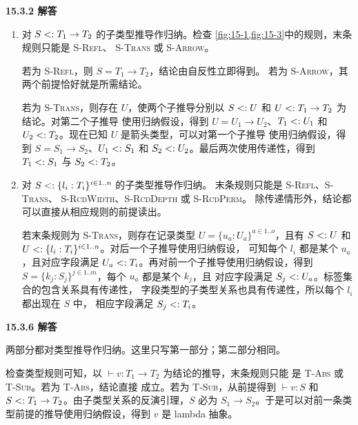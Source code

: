 \begin{taplauthorsolutionentrybox}
\label{sol:author:15.3.2}
\textbf{15.3.2 解答}

\begin{enumerate}
\item 对 \(S\mathrel{<:} T_1\to T_2\) 的子类型推导作归纳。检查
  \cref{fig:15-1,fig:15-3}中的规则，末条规则只能是 \textsc{S-Refl}、
  \textsc{S-Trans} 或 \textsc{S-Arrow}。

  若为 \textsc{S-Refl}，则 \(S=T_1\to T_2\)，结论由自反性立即得到。
  若为 \textsc{S-Arrow}，其两个前提恰好就是所需结论。

  若为 \textsc{S-Trans}，则存在 \(U\)，使两个子推导分别以
  \(S\mathrel{<:} U\) 和 \(U\mathrel{<:} T_1\to T_2\) 为结论。对第二个子推导
  使用归纳假设，得到 \(U=U_1\to U_2\)、\(T_1\mathrel{<:} U_1\) 和
  \(U_2\mathrel{<:} T_2\)。现在已知 \(U\) 是箭头类型，可以对第一个子推导
  使用归纳假设，得到 \(S=S_1\to S_2\)、\(U_1\mathrel{<:} S_1\) 和
  \(S_2\mathrel{<:} U_2\)。最后两次使用传递性，得到
  \(T_1\mathrel{<:} S_1\) 与 \(S_2\mathrel{<:} T_2\)。

\item 对 \(S\mathrel{<:}\{l_i:T_i\}^{i\in1..n}\) 的子类型推导作归纳。
  末条规则只能是 \textsc{S-Refl}、\textsc{S-Trans}、
  \textsc{S-RcdWidth}、\textsc{S-RcdDepth} 或 \textsc{S-RcdPerm}。
  除传递情形外，结论都可以直接从相应规则的前提读出。

  若末条规则为 \textsc{S-Trans}，则存在记录类型
  \(U=\{u_a:U_a\}^{a\in1..o}\)，且有 \(S\mathrel{<:} U\) 和
  \(U\mathrel{<:}\{l_i:T_i\}^{i\in1..n}\)。对后一个子推导使用归纳假设，
  可知每个 \(l_i\) 都是某个 \(u_a\)，且对应字段满足
  \(U_a\mathrel{<:} T_i\)。再对前一个子推导使用归纳假设，得到
  \(S=\{k_j:S_j\}^{j\in1..m}\)，每个 \(u_a\) 都是某个 \(k_j\)，且
  对应字段满足 \(S_j\mathrel{<:} U_a\)。标签集合的包含关系具有传递性，
  字段类型的子类型关系也具有传递性，所以每个 \(l_i\) 都出现在 \(S\) 中，
  相应字段满足 \(S_j\mathrel{<:} T_i\)。
\end{enumerate}

\end{taplauthorsolutionentrybox}

\begin{taplauthorsolutionentrybox}
\label{sol:author:15.3.6}
\textbf{15.3.6 解答}

两部分都对类型推导作归纳。这里只写第一部分；第二部分相同。

检查类型规则可知，以 \(\vdash v:T_1\to T_2\) 为结论的推导，末条规则只能
是 \textsc{T-Abs} 或 \textsc{T-Sub}。若为 \textsc{T-Abs}，结论直接
成立。若为 \textsc{T-Sub}，从前提得到 \(\vdash v:S\) 和
\(S\mathrel{<:} T_1\to T_2\)。由子类型关系的反演引理，\(S\) 必为
\(S_1\to S_2\)。于是可以对前一条类型前提的推导使用归纳假设，得到
\(v\) 是 lambda 抽象。

\end{taplauthorsolutionentrybox}
